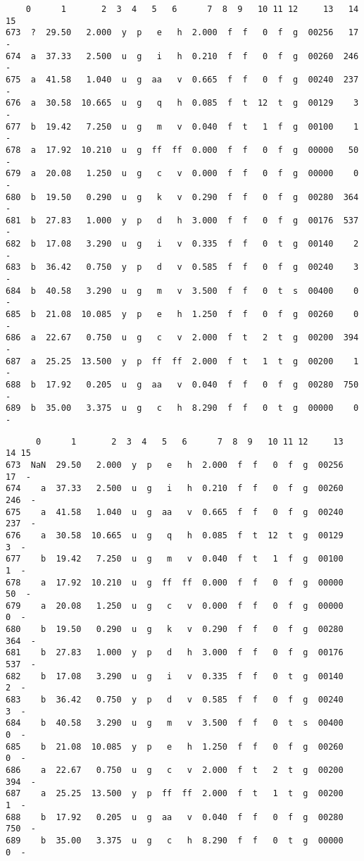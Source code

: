 \documentclass[11pt]{article}
\begin{document}
    
    \begin{verbatim}
    0      1       2  3  4   5   6      7  8  9   10 11 12     13   14 15
673  ?  29.50   2.000  y  p   e   h  2.000  f  f   0  f  g  00256   17  -
674  a  37.33   2.500  u  g   i   h  0.210  f  f   0  f  g  00260  246  -
675  a  41.58   1.040  u  g  aa   v  0.665  f  f   0  f  g  00240  237  -
676  a  30.58  10.665  u  g   q   h  0.085  f  t  12  t  g  00129    3  -
677  b  19.42   7.250  u  g   m   v  0.040  f  t   1  f  g  00100    1  -
678  a  17.92  10.210  u  g  ff  ff  0.000  f  f   0  f  g  00000   50  -
679  a  20.08   1.250  u  g   c   v  0.000  f  f   0  f  g  00000    0  -
680  b  19.50   0.290  u  g   k   v  0.290  f  f   0  f  g  00280  364  -
681  b  27.83   1.000  y  p   d   h  3.000  f  f   0  f  g  00176  537  -
682  b  17.08   3.290  u  g   i   v  0.335  f  f   0  t  g  00140    2  -
683  b  36.42   0.750  y  p   d   v  0.585  f  f   0  f  g  00240    3  -
684  b  40.58   3.290  u  g   m   v  3.500  f  f   0  t  s  00400    0  -
685  b  21.08  10.085  y  p   e   h  1.250  f  f   0  f  g  00260    0  -
686  a  22.67   0.750  u  g   c   v  2.000  f  t   2  t  g  00200  394  -
687  a  25.25  13.500  y  p  ff  ff  2.000  f  t   1  t  g  00200    1  -
688  b  17.92   0.205  u  g  aa   v  0.040  f  f   0  f  g  00280  750  -
689  b  35.00   3.375  u  g   c   h  8.290  f  f   0  t  g  00000    0  -
    \end{verbatim}

    
    
    \begin{verbatim}
      0      1       2  3  4   5   6      7  8  9   10 11 12     13   14 15
673  NaN  29.50   2.000  y  p   e   h  2.000  f  f   0  f  g  00256   17  -
674    a  37.33   2.500  u  g   i   h  0.210  f  f   0  f  g  00260  246  -
675    a  41.58   1.040  u  g  aa   v  0.665  f  f   0  f  g  00240  237  -
676    a  30.58  10.665  u  g   q   h  0.085  f  t  12  t  g  00129    3  -
677    b  19.42   7.250  u  g   m   v  0.040  f  t   1  f  g  00100    1  -
678    a  17.92  10.210  u  g  ff  ff  0.000  f  f   0  f  g  00000   50  -
679    a  20.08   1.250  u  g   c   v  0.000  f  f   0  f  g  00000    0  -
680    b  19.50   0.290  u  g   k   v  0.290  f  f   0  f  g  00280  364  -
681    b  27.83   1.000  y  p   d   h  3.000  f  f   0  f  g  00176  537  -
682    b  17.08   3.290  u  g   i   v  0.335  f  f   0  t  g  00140    2  -
683    b  36.42   0.750  y  p   d   v  0.585  f  f   0  f  g  00240    3  -
684    b  40.58   3.290  u  g   m   v  3.500  f  f   0  t  s  00400    0  -
685    b  21.08  10.085  y  p   e   h  1.250  f  f   0  f  g  00260    0  -
686    a  22.67   0.750  u  g   c   v  2.000  f  t   2  t  g  00200  394  -
687    a  25.25  13.500  y  p  ff  ff  2.000  f  t   1  t  g  00200    1  -
688    b  17.92   0.205  u  g  aa   v  0.040  f  f   0  f  g  00280  750  -
689    b  35.00   3.375  u  g   c   h  8.290  f  f   0  t  g  00000    0  -
    \end{verbatim}
\end{document}
